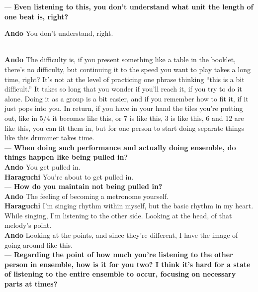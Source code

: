 \begin{description}
--- {\bf Even listening to this, you don't understand what unit the length of one beat is, right?}

{\bf Ando} You don't understand, right.\\

\item [Where do you think the difficulty of live performance lies?]\mbox{}\\

{\bf Ando} The difficulty is, if you present something like a table in the booklet, there's no difficulty, but continuing it to the speed you want to play takes a long time, right? It's not at the level of practicing one phrase thinking ``this is a bit difficult.'' It takes so long that you wonder if you'll reach it, if you try to do it alone. Doing it as a group is a bit easier, and if you remember how to fit it, if it just pops into you. In return, if you have in your hand the tiles you're putting out, like in 5/4 it becomes like this, or 7 is like this, 3 is like this, 6 and 12 are like this, you can fit them in, but for one person to start doing separate things like this drummer takes time.\\

--- {\bf When doing such performance and actually doing ensemble, do things happen like being pulled in?}\\

{\bf Ando} You get pulled in.\\

{\bf Haraguchi} You're about to get pulled in.\\

--- {\bf How do you maintain not being pulled in?}\\

{\bf Ando} The feeling of becoming a metronome yourself.\\

{\bf Haraguchi} I'm singing rhythm within myself, but the basic rhythm in my heart. While singing, I'm listening to the other side. Looking at the head, of that melody's point.\\

{\bf Ando} Looking at the points, and since they're different, I have the image of going around like this.\\

--- {\bf Regarding the point of how much you're listening to the other person in ensemble, how is it for you two? I think it's hard for a state of listening to the entire ensemble to occur, focusing on necessary parts at times?}\\


\end{description}
